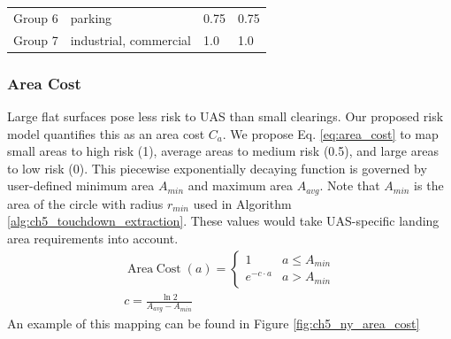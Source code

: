 \begin{table}[ht]
\begin{tabular}{p{1.5cm}p{4.4cm}p{1.6cm}p{1.7cm}}
Group 6 & parking                                                                                                                        & 0.75 & 0.75 \\ %
Group 7 & industrial, commercial                                                                                                         & 1.0 & 1.0 \\ %
\end{tabular}
\end{table}

\subsubsection{Area Cost}
Large flat surfaces pose less risk to UAS than small clearings. Our proposed risk model quantifies this as an area cost $C_a$. We propose Eq. \ref{eq:area_cost} to map small areas to high risk (1), average areas to medium risk (0.5), and large areas to low risk (0). This piecewise exponentially decaying function is governed by user-defined minimum area $A_{min}$ and maximum area $A_{avg}$.  Note that $A_{min}$ is the area of the circle with radius $r_{min}$ used in Algorithm \ref{alg:ch5_touchdown_extraction}. These values would take UAS-specific landing area requirements into account.
\begin{align}\label{eq:area_cost}
    \operatorname{Area\; Cost} (a) = \begin{cases} 
       1 & a \leq A_{min} \\
       e^{-c \cdot a} &  a > A_{min}
   \end{cases} \\
   c = \frac{\ln{2}}{A_{avg}- A_{min}}
\end{align}
An example of this mapping can be found in Figure \ref{fig:ch5_ny_area_cost}

